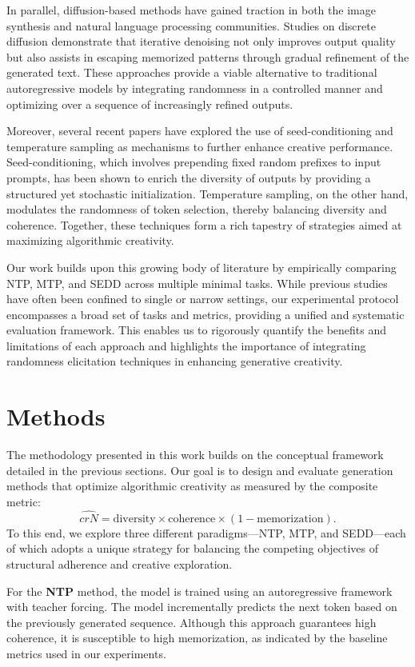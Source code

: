 \documentclass[12pt]{article}
\begin{document}
In parallel, diffusion-based methods have gained traction in both the image synthesis and natural language processing communities. Studies on discrete diffusion demonstrate that iterative denoising not only improves output quality but also assists in escaping memorized patterns through gradual refinement of the generated text. These approaches provide a viable alternative to traditional autoregressive models by integrating randomness in a controlled manner and optimizing over a sequence of increasingly refined outputs.

Moreover, several recent papers have explored the use of seed-conditioning and temperature sampling as mechanisms to further enhance creative performance. Seed-conditioning, which involves prepending fixed random prefixes to input prompts, has been shown to enrich the diversity of outputs by providing a structured yet stochastic initialization. Temperature sampling, on the other hand, modulates the randomness of token selection, thereby balancing diversity and coherence. Together, these techniques form a rich tapestry of strategies aimed at maximizing algorithmic creativity.

Our work builds upon this growing body of literature by empirically comparing NTP, MTP, and SEDD across multiple minimal tasks. While previous studies have often been confined to single or narrow settings, our experimental protocol encompasses a broad set of tasks and metrics, providing a unified and systematic evaluation framework. This enables us to rigorously quantify the benefits and limitations of each approach and highlights the importance of integrating randomness elicitation techniques in enhancing generative creativity.

\section{Methods}
The methodology presented in this work builds on the conceptual framework detailed in the previous sections. Our goal is to design and evaluate generation methods that optimize algorithmic creativity as measured by the composite metric:
\[
\hat{crN} = \text{diversity} \times \text{coherence} \times (1-\text{memorization}).
\]
To this end, we explore three different paradigms—NTP, MTP, and SEDD—each of which adopts a unique strategy for balancing the competing objectives of structural adherence and creative exploration.

For the \textbf{NTP} method, the model is trained using an autoregressive framework with teacher forcing. The model incrementally predicts the next token based on the previously generated sequence. Although this approach guarantees high coherence, it is susceptible to high memorization, as indicated by the baseline metrics used in our experiments.
\end{document}
